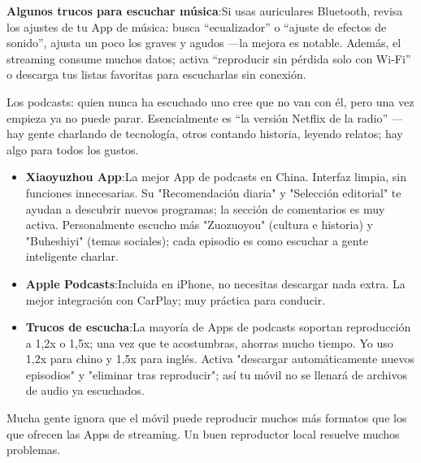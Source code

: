 \textbf{Algunos trucos para escuchar música}:Si usas auriculares Bluetooth, revisa los ajustes de tu App de música: busca “ecualizador” o “ajuste de efectos de sonido”, ajusta un poco los graves y agudos —la mejora es notable. Además, el streaming consume muchos datos; activa “reproducir sin pérdida solo con Wi-Fi” o descarga tus listas favoritas para escucharlas sin conexión.


Los podcasts: quien nunca ha escuchado uno cree que no van con él, pero una vez empieza ya no puede parar. Esencialmente es “la versión Netflix de la radio” —hay gente charlando de tecnología, otros contando historia, leyendo relatos; hay algo para todos los gustos.

\begin{itemize}
  \item \textbf{Xiaoyuzhou App}:La mejor App de podcasts en China. Interfaz limpia, sin funciones innecesarias. Su "Recomendación diaria" y "Selección editorial" te ayudan a descubrir nuevos programas; la sección de comentarios es muy activa. Personalmente escucho más "Zuozuoyou" (cultura e historia) y "Buheshiyi" (temas sociales); cada episodio es como escuchar a gente inteligente charlar.
  \item \textbf{Apple Podcasts}:Incluida en iPhone, no necesitas descargar nada extra. La mejor integración con CarPlay; muy práctica para conducir.
  \item \textbf{Trucos de escucha}:La mayoría de Apps de podcasts soportan reproducción a 1,2x o 1,5x; una vez que te acostumbras, ahorras mucho tiempo. Yo uso 1,2x para chino y 1,5x para inglés. Activa "descargar automáticamente nuevos episodios" y "eliminar tras reproducir"; así tu móvil no se llenará de archivos de audio ya escuchados.
\end{itemize}


Mucha gente ignora que el móvil puede reproducir muchos más formatos que los que ofrecen las Apps de streaming. Un buen reproductor local resuelve muchos problemas.

